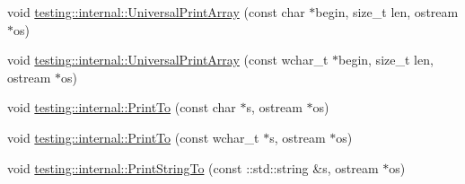 \begin{DoxyCompactItemize}
\item 
void \hyperlink{namespacetesting_1_1internal_a070107e7a8205ad6ec4d538d52b15b38}{testing\+::internal\+::\+Universal\+Print\+Array} (const char $\ast$begin, size\+\_\+t len, ostream $\ast$os)
\item 
void \hyperlink{namespacetesting_1_1internal_a52394019018eb5079f9f1bcca23dcd60}{testing\+::internal\+::\+Universal\+Print\+Array} (const wchar\+\_\+t $\ast$begin, size\+\_\+t len, ostream $\ast$os)
\item 
void \hyperlink{namespacetesting_1_1internal_adc6c98306d40b53fd07be4e295102a0a}{testing\+::internal\+::\+Print\+To} (const char $\ast$s, ostream $\ast$os)
\item 
void \hyperlink{namespacetesting_1_1internal_afc20fb56b2547a8f91f9ff99650f2024}{testing\+::internal\+::\+Print\+To} (const wchar\+\_\+t $\ast$s, ostream $\ast$os)
\item 
void \hyperlink{namespacetesting_1_1internal_ad609167d8d6792b0fb186539e0e159bd}{testing\+::internal\+::\+Print\+String\+To} (const \+::std\+::string \&s, ostream $\ast$os)
\end{DoxyCompactItemize}

